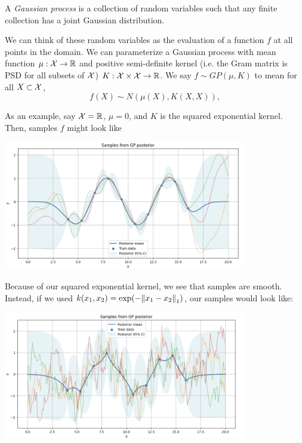 \documentclass{article}
\begin{document}
\begin{defi}
    A \emph{Gaussian process} is a collection of random variables such that any finite collection has a joint Gaussian distribution. 

    We can think of these random variables as the evaluation of a function $f$ at all points in the domain. We can parameterize a Gaussian process with mean function $\mu  : \mathcal{X} \to  \mathbb{R} $ and positive semi-definite kernel (i.e. the Gram matrix is PSD for all subsets of $\mathcal{X} $) $K : \mathcal{X}  \times \mathcal{X}  \to  \mathbb{R} $. We say $f \sim GP(\mu , K)$ to mean for all $X \subset \mathcal{X} $, 
    \[
        f(X) \sim N(\mu (X), K(X, X)), 
    \]
    
    As an example, say $\mathcal{X} = \mathbb{R} $, $\mu  = 0$, and $K$ is the squared exponential kernel. Then, samples $f$ might look like
    \begin{center}
      \begin{center}
        \includegraphics[width=0.8\textwidth]{images/2025-03-08-13-13-53.png}
      \end{center}
    \end{center} 
    Because of our squared exponential kernel, we see that samples are smooth. Instead, if we used $k(x_1 , x_2 ) = \exp (-\norm*{x_1 -x_2 }_{1} )$, our samples would look like:
    \begin{center}
      \includegraphics[width=0.8\textwidth]{images/2025-03-08-13-13-10.png}
    \end{center} 
\end{defi}
\end{document}
